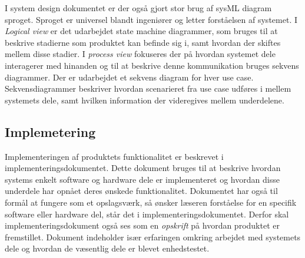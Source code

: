 	I system design dokumentet er der også gjort stor brug af sysML diagram sproget. Sproget er universel blandt ingeniører og letter forståelsen af systemet. I \textit{Logical view} er det udarbejdet state machine diagrammer, som bruges til at beskrive stadierne som produktet kan befinde sig i, samt hvordan der skiftes mellem disse stadier. I \textit{process view} fokuseres der på hvordan systemet dele interagerer med hinanden og til at beskrive denne kommunikation bruges sekvens diagrammer. Der er udarbejdet et sekvens diagram for hver use case. Sekvensdiagrammer beskriver hvordan scenarieret fra use case udføres i mellem systemets dele, samt hvilken information der videregives mellem underdelene. 
	
	\subsection{Implemetering} \label{title:implementering}
	Implementeringen af produktets funktionalitet er beskrevet i implementeringsdokumentet. Dette dokument bruges til at beskrive hvordan systems enkelt software og hardware dele er implementeret og hvordan disse underdele har opnået deres ønskede funktionalitet. Dokumentet har også til formål at fungere som et opslagsværk, så ønsker læseren forståelse for en specifik software eller hardware del, står det i implementeringsdokumentet. Derfor skal implementeringsdokument også ses som en \textit{opskrift} på hvordan produktet er fremstillet. Dokument indeholder især erfaringen omkring arbejdet med systemets dele og hvordan de væsentlig dele er blevet enhedstestet. 

